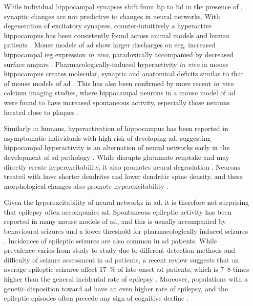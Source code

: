 While individual hippocampal synapses shift from \gls{ltp} to \gls{ltd} in the presence of \abeta{}, synaptic changes are not predictive to changes in neural networks. With degeneration of excitatory synapses, counter-intuitively a hyperactive hippocampus has been consistently found across animal models and human patients \citep{palop16}. Mouse models of \gls{ad} show larger discharges on \gls{eeg}, increased hippocampal \gls{ieg} expression \textit{in vivo}, paradoxically accompanied by decreased surface \glspl{ampar} \citep{palop07, harris10, born14}. Pharmacologically-induced hyperactivity \textit{in vivo} in mouse hippocampus creates molecular, synaptic and anatomical deficits similar to that of mouse models of \gls{ad} \citep{palop07}. This has also been confirmed by more recent \textit{in vivo} calcium imaging studies, where hippocampal neurons in a mouse model of \gls{ad} were found to have increased spontaneous activity, especially those neurons located close to plaques \citep{busche12}. 

Similarly in humans, hyperactivation of hippocampus has been reported in asymptomatic individuals with high risk of developing \gls{ad}, suggesting hippocampal hyperactivity is an alternation of neural networks early in the development of \gls{ad} pathology \citep{sperling09, reiman12}. While \abeta{} disrupts glutamate reuptake and may directly create hyperexcitability, it also promotes neural degradation \citep{spires04, koffie09}. Neurons treated with \abeta{} have shorter dendrites and lower dendritic spine density, and these morphological changes also promote hyperexcitability \citep{siskova14}.

Given the hyperexcitability of neural networks in \gls{ad}, it is therefore not surprising that epilepsy often accompanies \gls{ad}. Spontaneous epileptic activity has been reported in many mouse models of \gls{ad}, and this is usually accompanied by behavioural seizures and a lower threshold for pharmacologically induced seizures \citep{palop07, um12, ittner10}. Incidences of epileptic seizures are also common in \gls{ad} patients. While prevalence varies from study to study due to different detection methods and difficulty of seizure assessment in \gls{ad} patients, a recent review suggests that on average epileptic seizures affect \SI{17}{\percent} of late-onset \gls{ad} patients, which is 7--8 times higher than the general incidental rate of epilepsy \citep{amatniek06, horvath16}. Moreover, populations with a genetic disposition toward \gls{ad} have an even higher rate of epilepsy, and the epileptic episodes often precede any sign of cognitive decline \citep{moehlmann02,cabrejo06,mcnaughton12}. 

